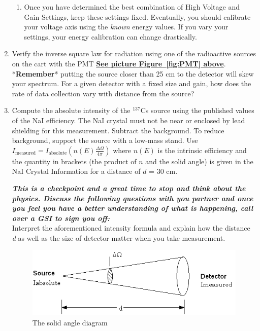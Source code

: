 \documentclass{../lab}
\begin{document}
\begin{enumerate}
\begin{enumerate}
        \item Once you have determined the best combination of High Voltage and Gain Settings, keep these settings fixed. Eventually, you should calibrate your voltage axis using the \emph{known} energy values. If you vary your settings, your energy calibration can change drastically.

    \end{enumerate}

    \item Verify the inverse square law for radiation using one of the radioactive sources on the cart with the PMT \href{http://experimentationlab.berkeley.edu/sites/default/files/images/GMA_PMT_3519-Lg.jpg}{\textbf{See picture Figure~\ref{fig:PMT} above}}. *\textbf{Remember}* putting the source closer than 25 cm to the detector will skew your spectrum. For a given detector with a fixed size and gain, how does the rate of data collection vary with distance from the source?

    \item Compute the absolute intensity of the $^{137}$Cs source using the published values of the NaI efficiency. The NaI crystal must not be near or enclosed by lead shielding for this measurement. Subtract the background. To reduce background, support the source with a low-mass stand. Use $I_\textrm{measured} = I_\textrm{absolute} (n(E)\frac{\Delta\Omega}{4\pi})$ where $n(E)$ is the intrinsic efficiency and the quantity in brackets (the product of $n$ and the solid angle) is given in the NaI Crystal Information for a distance of $d$ = 30 cm.
    
    \emph{\textbf{This is a checkpoint and a great time to stop and think about the physics. Discuss the following questions with you partner and once you feel you have a better understanding of what is happening, call over a GSI to sign you off:}}\\
    Interpret the aforementioned intensity formula and explain how the distance \emph{d} as well as the size of detector matter when you take measurement.

    \begin{figure}[h]
        \centering
        \href{http://experimentationlab.berkeley.edu/sites/default/files/images/GMAimage007.gif}{\includegraphics[width=0.8\linewidth]{images/GMAimage007.png}} \\ The solid angle diagram
        \label{fig:GMAimage007}
    \end{figure}


\end{enumerate}
\end{document}

